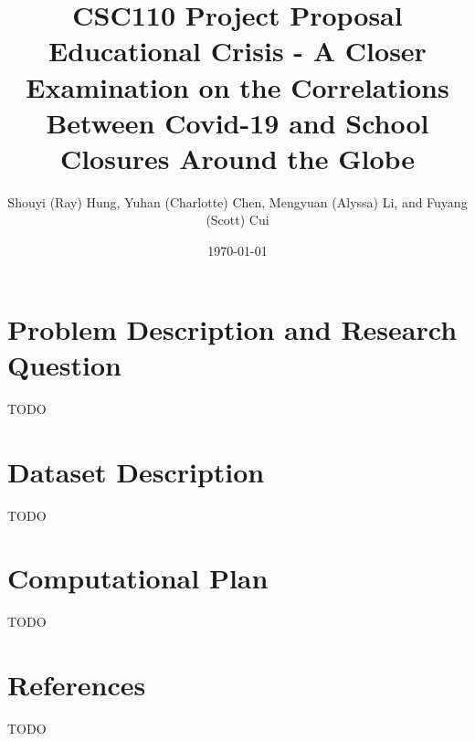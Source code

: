 \documentclass[fontsize=11pt]{article}
\title{CSC110 Project Proposal\\ Educational Crisis - A Closer Examination on the Correlations Between Covid-19 and School Closures Around the Globe}
\author{Shouyi (Ray) Hung, Yuhan (Charlotte) Chen, Mengyuan (Alyssa) Li, and Fuyang (Scott) Cui}
\date{\today}
\begin{document}
\maketitle

\section*{Problem Description and Research Question}

TODO

\section*{Dataset Description}

TODO

\section*{Computational Plan}

TODO

\section*{References}

TODO

\end{document}
